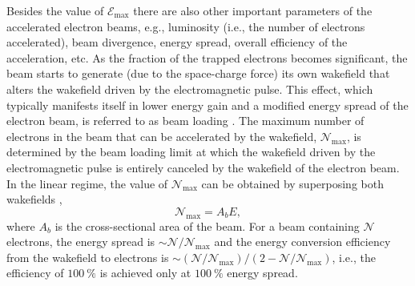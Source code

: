 \documentclass[10pt, a4paper, twoside, openright]{report}
\begin{document}
Besides the value of $ \mathcal{E}_{\mathrm{max}} $ there are also other important parameters of the accelerated electron beams, e.g., luminosity (i.e., the number of electrons accelerated), beam divergence, energy spread, overall efficiency of the acceleration, etc. As the fraction of the trapped electrons becomes significant, the beam starts to generate (due to the space-charge force) its own wakefield that alters the wakefield driven by the electromagnetic pulse. This effect, which typically manifests itself in lower energy gain and a modified energy spread of the electron beam, is referred to as beam loading \cite{Katsouleas1987, Tzoufras2008, Tzoufras2009}. The maximum number of electrons in the beam that can be accelerated by the wakefield, $ \mathcal{N}_{\mathrm{max}} $, is determined by the beam loading limit at which the wakefield driven by the electromagnetic pulse is entirely canceled by the wakefield of the electron beam. In the linear regime, the value of $ \mathcal{N}_{\mathrm{max}} $ can be obtained by superposing both wakefields \cite{Katsouleas1987},
\begin{equation}\label{eq:beam_loading}
	 \mathcal{N}_{\mathrm{max}} = A_{b} E,
\end{equation}
where $ A_b $ is the cross-sectional area of the beam. For a beam containing $ \mathcal{N} $ electrons, the energy spread is $ \sim \mathcal{N} / \mathcal{N}_{\mathrm{max}} $ and the energy conversion efficiency from the wakefield to electrons is $ \sim \left( \mathcal{N} / \mathcal{N}_{\mathrm{max}} \right) / \left( 2 - \mathcal{N} / \mathcal{N}_{\mathrm{max}} \right) $, i.e., the efficiency of $ 100 \ \% $ is achieved only at $ 100 \ \% $ energy spread.


%

%

%

%
\end{document}
